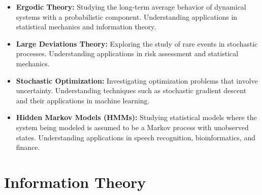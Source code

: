 \documentclass[openany]{book}
\begin{document}
\begin{itemize}
    \item \textbf{Ergodic Theory:} Studying the long-term average behavior of dynamical systems with a probabilistic component. Understanding applications in statistical mechanics and information theory.
    \item \textbf{Large Deviations Theory:} Exploring the study of rare events in stochastic processes. Understanding applications in risk assessment and statistical mechanics.
    \item \textbf{Stochastic Optimization:} Investigating optimization problems that involve uncertainty. Understanding techniques such as stochastic gradient descent and their applications in machine learning.
    \item \textbf{Hidden Markov Models (HMMs):} Studying statistical models where the system being modeled is assumed to be a Markov process with unobserved states. Understanding applications in speech recognition, bioinformatics, and finance.
\end{itemize}
\section{Information Theory}
\end{document}
